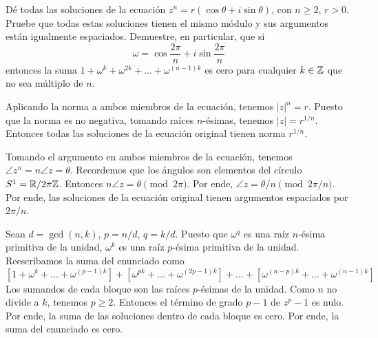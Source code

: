 \begin{exercise}
Dé todas las soluciones de la ecuación $z^n = r (\cos \theta + i \sin \theta)$, con $n \ge 2$, $r > 0$. Pruebe que todas estas soluciones tienen el mismo módulo y sus argumentos están igualmente espaciados. Demuestre, en particular, que si
$$\omega = \cos \frac {2\pi} n + i \sin \frac {2\pi} n$$
entonces la suma $1 + \omega^k + \omega^{2k} + \dots + \omega^{(n-1)k}$ es cero para cualquier $k \in \mathbb Z$ que no sea múltiplo de $n$.
\end{exercise}

\begin{solution}
Aplicando la norma a ambos miembros de la ecuación, tenemos $|z|^n = r$. Puesto que la norma es no negativa, tomando raíces $n$-ésimas, tenemos $|z| = r^{1/n}$. Entonces todas las soluciones de la ecuación original tienen norma $r^{1/n}$.

Tomando el argumento en ambos miembros de la ecuación, tenemos $\angle z^n = n \angle z = \theta$. Recordemos que los ángulos son elementos del círculo $S^1 = \mathbb R / 2\pi\mathbb Z$. Entonces $n \angle z = \theta \pmod {2\pi}$. Por ende, $\angle z = \theta/n \pmod {2\pi/n}$. Por ende, las soluciones de la ecuación original tienen argumentos espaciados por $2\pi/n$.

Sean $d = \gcd(n, k)$, $p = n/d$, $q = k/d$. Puesto que $\omega^q$ es una raíz $n$-ésima primitiva de la unidad, $\omega^k$ es una raíz $p$-ésima primitiva de la unidad. Reescribamos la suma del enunciado como
$$\left[ 1 + \omega^k + \dots + \omega^{(p-1)k} \right] + \left[ \omega^{pk} + \dots + \omega^{(2p-1)k} \right] + \dots + \left[ \omega^{(n-p)k} + \dots + \omega^{(n-1)k} \right]$$
Los sumandos de cada bloque son las raíces $p$-ésimas de la unidad. Como $n$ no divide a $k$, tenemos $p \ge 2$. Entonces el término de grado $p-1$ de $z^p - 1$ es nulo. Por ende, la suma de las soluciones dentro de cada bloque es cero. Por ende, la suma del enunciado es cero.
\end{solution}
